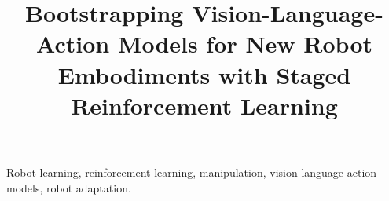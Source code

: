 \documentclass[letterpaper,journal]{IEEEtran}
\begin{document}
\title{Bootstrapping Vision-Language-Action Models for New Robot Embodiments with Staged Reinforcement Learning}
\author{}
\IEEEaftertitletext{\vspace{1em}}
\maketitle

\begin{IEEEkeywords}
Robot learning, reinforcement learning, manipulation, vision-language-action models, robot adaptation.
\end{IEEEkeywords}






\newpage


\end{document}
